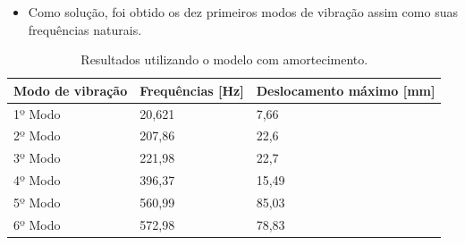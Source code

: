 \begin{enumerate}
\begin{itemize}
		\item Como solução, foi obtido os dez primeiros modos de vibração assim como suas frequências naturais.
	\end{itemize}
\end{enumerate}

\begin{table}[H]
	\centering
	\caption{Resultados utilizando o modelo com amortecimento.}
	\begin{tabular}{|l|l|l|}
		\hline
		Modo de vibração & Frequências {[}Hz{]} & Deslocamento máximo {[}mm{]} \\ \hline
		1º Modo          & 20,621               & 7,66                         \\ \hline
		2º Modo          & 207,86               & 22,6                         \\ \hline
		3º Modo          & 221,98               & 22,7                         \\ \hline
		4º Modo          & 396,37               & 15,49                        \\ \hline
		5º Modo          & 560,99               & 85,03                        \\ \hline
		6º Modo          & 572,98               & 78,83                        \\ \hline
	\end{tabular}
\end{table}

